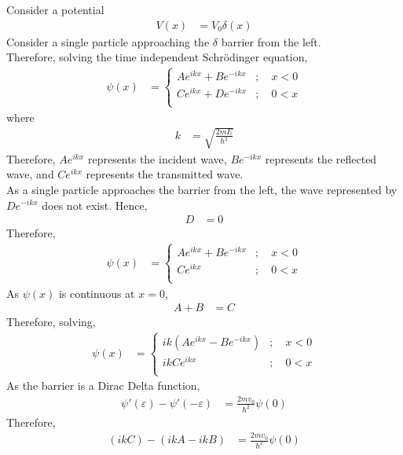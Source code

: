 \documentclass[titlepage, fleqn, a4paper, 12pt, twoside]{article}
\theoremstyle{definition}
\theoremstyle{theorem}
\begin{document}
Consider a potential
\begin{align*}
	V(x) &= V_0 \delta(x)
\end{align*}
Consider a single particle approaching the $\delta$ barrier from the left.\\
Therefore, solving the time independent Schrödinger equation,
\begin{align*}
	\psi(x) &=
		\begin{cases}
			A e^{i k x} + B e^{-i k x} &;\quad x < 0\\
			C e^{i k x} + D e^{-i k x} &;\quad 0 < x\\
		\end{cases}
\end{align*}
where
\begin{align*}
	k &= \sqrt{\frac{2 m E}{\hbar^2}}
\end{align*}
Therefore, $A e^{i k x}$ represents the incident wave, $B e^{-i k x}$ represents the reflected wave, and $C e^{i k x}$ represents the transmitted wave.\\
As a single particle approaches the barrier from the left, the wave represented by $D e^{-i k x}$ does not exist.
Hence,
\begin{align*}
	D &= 0
\end{align*}
Therefore,
\begin{align*}
	\psi(x) &=
		\begin{cases}
			A e^{i k x} + B e^{-i k x} &;\quad x < 0\\
			C e^{i k x} &;\quad 0 < x\\
		\end{cases}
\end{align*}
As $\psi(x)$ is continuous at $x = 0$,
\begin{align*}
	A + B &= C
\end{align*}
Therefore, solving,
\begin{align*}
	\psi(x) &=
		\begin{cases}
			i k \left( A e^{i k x} - B e^{-i k x} \right) &;\quad x < 0\\
			i k C e^{i k x} &;\quad 0 < x\\
		\end{cases}
\end{align*}
As the barrier is a Dirac Delta function,
\begin{align*}
	\psi'(\varepsilon) - \psi'(-\varepsilon) &= \frac{2 m v_0}{\hbar^2} \psi(0)
\end{align*}
Therefore,
\begin{align*}
	(i k C) - (i k A - i k B) &= \frac{2 m v_0}{\hbar^2} \psi(0)
\end{align*}
\end{document}
